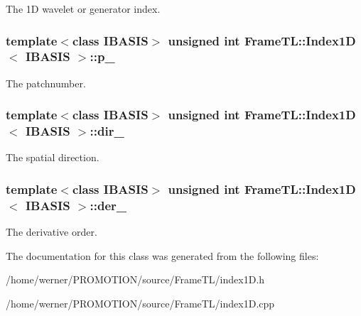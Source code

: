 The 1D wavelet or generator index. \hypertarget{classFrameTL_1_1Index1D_76b815344076e70d88f55782813d380e}{
\subsubsection[p\_\-]{\setlength{\rightskip}{0pt plus 5cm}template$<$class IBASIS$>$ unsigned int {\bf FrameTL::Index1D}$<$ IBASIS $>$::{\bf p\_\-}}}
\label{classFrameTL_1_1Index1D_76b815344076e70d88f55782813d380e}


The patchnumber. \hypertarget{classFrameTL_1_1Index1D_6415d2263117ba0f0b88acfb6b25558b}{
\subsubsection[dir\_\-]{\setlength{\rightskip}{0pt plus 5cm}template$<$class IBASIS$>$ unsigned int {\bf FrameTL::Index1D}$<$ IBASIS $>$::{\bf dir\_\-}}}
\label{classFrameTL_1_1Index1D_6415d2263117ba0f0b88acfb6b25558b}


The spatial direction. \hypertarget{classFrameTL_1_1Index1D_edcb84781a4ebd4dde1a85197fd270f6}{
\subsubsection[der\_\-]{\setlength{\rightskip}{0pt plus 5cm}template$<$class IBASIS$>$ unsigned int {\bf FrameTL::Index1D}$<$ IBASIS $>$::{\bf der\_\-}}}
\label{classFrameTL_1_1Index1D_edcb84781a4ebd4dde1a85197fd270f6}


The derivative order. 

The documentation for this class was generated from the following files:\begin{CompactItemize}
\item 
/home/werner/PROMOTION/source/FrameTL/index1D.h\item 
/home/werner/PROMOTION/source/FrameTL/index1D.cpp\end{CompactItemize}
